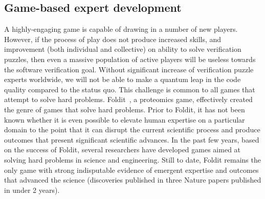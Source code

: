 \documentclass{sig-alternate}
\begin{document}
% 
% 


\subsection{Game-based expert development}
 
A highly-engaging game is capable of drawing in a number of new
players.  However, if the process of play does not produce increased
skills, and improvement (both individual and collective) on ability to
solve verification puzzles, then even a massive population of active
players will be useless towards the software verification goal.
Without significant increase of verification puzzle experts worldwide,
we will not be able to make a quantum leap in the code quality
compared to the status quo.  This challenge is common to all games
that attempt to solve hard problems.  Foldit~\cite{cooper10challenge,cooper11analysis}, a proteomics game,
effectively created the genre of games that solve hard problems.
Prior to Foldit, it has not been known whether it is even possible to
elevate human expertise on a particular domain to the point that it
can disrupt the current scientific process and produce outcomes that
present significant scientific advances.  In the past few years, based
on the success of Foldit, several researchers have developed games
aimed at solving hard problems in science and engineering.  Still to
date, Foldit remains the only game with strong indisputable evidence
of emergent expertise and outcomes that advanced the science
(discoveries published in three Nature papers published in under 2
years).
 
\end{document}
